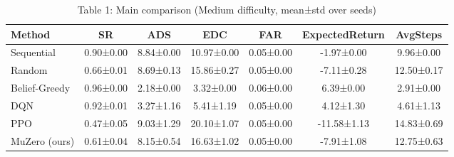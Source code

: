 \begin{table}[htbp]
\centering
\caption{Table 1: Main comparison (Medium difficulty, mean±std over seeds)}
\begin{tabular}{lcccccc}
\toprule
Method & SR & ADS & EDC & FAR & ExpectedReturn & AvgSteps \\
\midrule
Sequential & 0.90±0.00 & 8.84±0.00 & 10.97±0.00 & 0.05±0.00 & -1.97±0.00 & 9.96±0.00 \\
Random & 0.66±0.01 & 8.69±0.13 & 15.86±0.27 & 0.05±0.00 & -7.11±0.28 & 12.50±0.17 \\
Belief-Greedy & 0.96±0.00 & 2.18±0.00 & 3.32±0.00 & 0.06±0.00 & 6.39±0.00 & 2.91±0.00 \\
DQN & 0.92±0.01 & 3.27±1.16 & 5.41±1.19 & 0.05±0.00 & 4.12±1.30 & 4.61±1.13 \\
PPO & 0.47±0.05 & 9.03±1.29 & 20.10±1.07 & 0.05±0.00 & -11.58±1.13 & 14.83±0.69 \\
MuZero (ours) & 0.61±0.04 & 8.15±0.54 & 16.63±1.02 & 0.05±0.00 & -7.91±1.08 & 12.75±0.63 \\
\bottomrule
\end{tabular}
\end{table}
